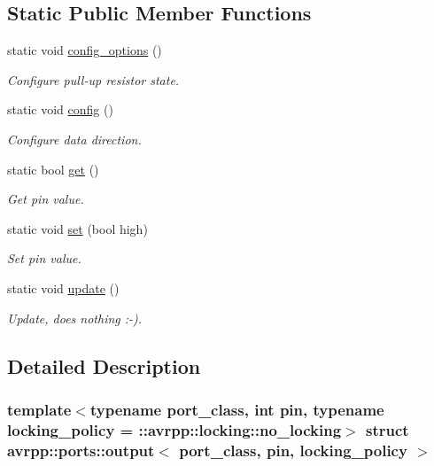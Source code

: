 \subsection*{Static Public Member Functions}
\begin{DoxyCompactItemize}
\item 
static void \hyperlink{structavrpp_1_1ports_1_1output_a9495ddf29fb52e91397a10e4778bfd66}{config\_\-options} ()
\begin{DoxyCompactList}\small\item\em Configure pull-\/up resistor state. \item\end{DoxyCompactList}\item 
static void \hyperlink{structavrpp_1_1ports_1_1output_adb03c37b46d1941afcc1967034f60e5e}{config} ()
\begin{DoxyCompactList}\small\item\em Configure data direction. \item\end{DoxyCompactList}\item 
static bool \hyperlink{structavrpp_1_1ports_1_1output_a9c5d06246700ef0558430ca9799b5ce5}{get} ()
\begin{DoxyCompactList}\small\item\em Get pin value. \item\end{DoxyCompactList}\item 
static void \hyperlink{structavrpp_1_1ports_1_1output_a5eb7d6e13fcef239f3ce24696299da60}{set} (bool high)
\begin{DoxyCompactList}\small\item\em Set pin value. \item\end{DoxyCompactList}\item 
static void \hyperlink{structavrpp_1_1ports_1_1output_a1be2d4a7e0b234e63547fb123cee9c25}{update} ()
\begin{DoxyCompactList}\small\item\em Update, does nothing :-\/). \item\end{DoxyCompactList}\end{DoxyCompactItemize}


\subsection{Detailed Description}
\subsubsection*{template$<$typename port\_\-class, int pin, typename locking\_\-policy = ::avrpp::locking::no\_\-locking$>$ struct avrpp::ports::output$<$ port\_\-class, pin, locking\_\-policy $>$}

